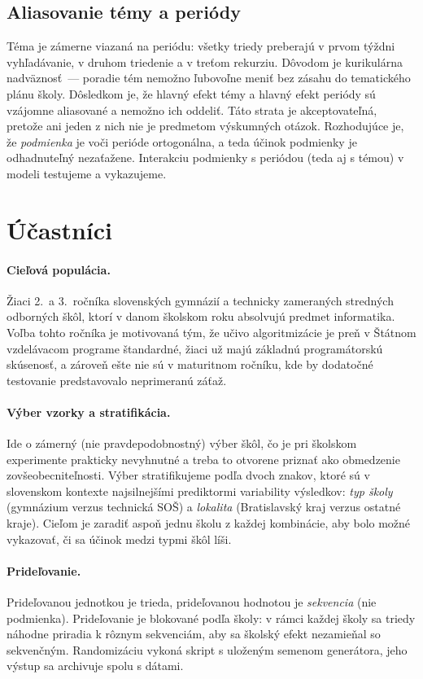 \subsection{Aliasovanie témy a periódy}

Téma je zámerne viazaná na periódu: všetky triedy preberajú v prvom týždni vyhľadávanie, v druhom triedenie a v treťom rekurziu. Dôvodom je kurikulárna nadväznosť~--- poradie tém nemožno ľubovoľne meniť bez zásahu do tematického plánu školy. Dôsledkom je, že hlavný efekt témy a hlavný efekt periódy sú vzájomne aliasované a nemožno ich oddeliť. Táto strata je akceptovateľná, pretože ani jeden z nich nie je predmetom výskumných otázok. Rozhodujúce je, že \emph{podmienka} je voči perióde ortogonálna, a teda účinok podmienky je odhadnuteľný nezaťažene. Interakciu podmienky s periódou (teda aj s témou) v modeli testujeme a vykazujeme.

\section{Účastníci}
\label{sec:ucastnici}

\paragraph{Cieľová populácia.} Žiaci 2.~a 3.~ročníka slovenských gymnázií a technicky zameraných stredných odborných škôl, ktorí v danom školskom roku absolvujú predmet informatika. Voľba tohto ročníka je motivovaná tým, že učivo algoritmizácie je preň v Štátnom vzdelávacom programe štandardné, žiaci už majú základnú programátorskú skúsenosť, a zároveň ešte nie sú v maturitnom ročníku, kde by dodatočné testovanie predstavovalo neprimeranú záťaž.

\paragraph{Výber vzorky a stratifikácia.} Ide o zámerný (nie pravdepodobnostný) výber škôl, čo je pri školskom experimente prakticky nevyhnutné a treba to otvorene priznať ako obmedzenie zovšeobecniteľnosti. Výber stratifikujeme podľa dvoch znakov, ktoré sú v slovenskom kontexte najsilnejšími prediktormi variability výsledkov: \emph{typ školy} (gymnázium verzus technická SOŠ) a \emph{lokalita} (Bratislavský kraj verzus ostatné kraje). Cieľom je zaradiť aspoň jednu školu z každej kombinácie, aby bolo možné vykazovať, či sa účinok medzi typmi škôl líši.

\paragraph{Prideľovanie.} Prideľovanou jednotkou je trieda, prideľovanou hodnotou je \emph{sekvencia} (nie podmienka). Prideľovanie je blokované podľa školy: v rámci každej školy sa triedy náhodne priradia k rôznym sekvenciám, aby sa školský efekt nezamieňal so sekvenčným. Randomizáciu vykoná skript s uloženým semenom generátora, jeho výstup sa archivuje spolu s dátami.

